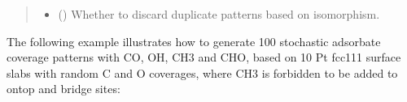 \documentclass[letterpaper,10pt,english]{sphinxmanual}
\begin{document}
\begin{fulllineitems}
\begin{fulllineitems}
\begin{quote}
\begin{description}
\begin{itemize}
\item {} 
 (\sphinxstyleliteralemphasis{\sphinxupquote{, }}) \textendash{} Whether to discard duplicate patterns based on isomorphism.

\end{itemize}

\end{description}\end{quote}

\end{fulllineitems}


\end{fulllineitems}



The following example illustrates how to generate 100 stochastic
adsorbate coverage patterns with CO, OH, CH3 and CHO, based on
10 Pt fcc111 surface slabs with random C and O coverages, where
CH3 is forbidden to be added to ontop and bridge sites:
\end{document}
